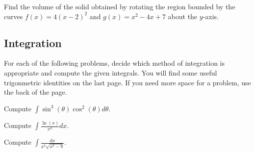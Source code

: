 \documentclass[12pt]{amsart}
\begin{document}


\begin{thm}[10 Points]
  Find the volume of the solid obtained by rotating the region bounded by the curves $f(x) = 4(x - 2)^2$ and $g(x) = x^2 - 4x + 7$ about the $y$-axis.
\end{thm}

\newpage

\subsection{Integration}

For each of the following problems, decide which method of integration is appropriate and compute the given integrals.
You will find some useful trigonmetric identities on the last page.
If you need more space for a problem, use the back of the page.



\begin{thm}[10 Points]
  Compute $\displaystyle{\int\sin^3(\theta)\cos^2(\theta)d\theta}$.
\end{thm}

\newpage

\begin{thm}[10 Points]
  Compute $\displaystyle{\int \frac{\ln(x)}{x^2}dx}$.
\end{thm}

\newpage

\begin{thm}[10 Points]
  Compute $\displaystyle{\int\frac{dx}{x^2\sqrt{x^2-9}}}$.
\end{thm}

\newpage
\end{document}
